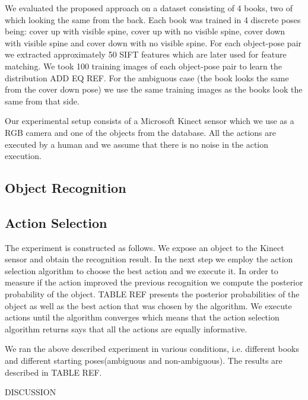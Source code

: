 \documentclass[conference]{IEEEtran}
\begin{document}
    We evaluated the proposed approach on a dataset consisting of 4 books, two of which looking the same from the back. Each book was trained in 4 discrete poses being: cover up with visible spine, cover up with no visible spine, cover down with visible spine and cover down with no visible spine. For each object-pose pair we extracted approximately 50 SIFT features which are later used for feature matching. We took 100 training images of each object-pose pair to learn the distribution ADD EQ REF. For the ambiguous case (the book looks the same from the cover down pose) we use the same training images as the books look the same from that side.

    Our experimental setup consists of a Microsoft Kinect sensor which we use as a RGB camera and one of the objects from the database. All the actions are executed by a human and we assume that there is no noise in the action execution. 

    \subsection{Object Recognition}

    \subsection{Action Selection}
        The experiment is constructed as follows. We expose an object to the Kinect sensor and obtain the recognition result. In the next step we employ the action selection algorithm to choose the best action and we execute it. In order to measure if the action improved the previous recognition we compute the posterior probability of the object. TABLE REF presents the posterior probabilities of the object as well as the best action that was chosen by the algorithm. We execute actions until the algorithm converges which means that the action selection algorithm returns says that all the actions are equally informative.

        We ran the above described experiment in various conditions, i.e. different books and different starting poses(ambiguous and non-ambiguous). The results are described in TABLE REF.
        
        DISCUSSION


\end{document}
